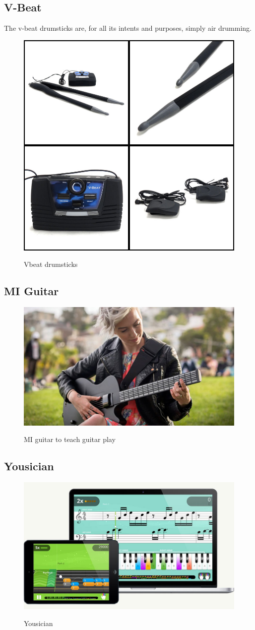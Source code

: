 	\subsection{V-Beat}
		The v-beat drumsticks are, for all its intents and purposes, simply air drumming.
		\begin{figure}[H]
			\centering
			\includegraphics[width=0.5\linewidth]{figure/Analysis/vbeat}
			\label{fig:vbeat}
			\caption{Vbeat drumsticks}
		\end{figure}
		
	\subsection{MI Guitar}
		\begin{figure}[H]
			\centering
			\includegraphics[width=0.8\linewidth]{figure/Analysis/miguitar}
			\label{fig:miguitar}
			\caption{MI guitar to teach guitar play}
		\end{figure}
	
	\subsection{Yousician}
		\begin{figure}[H]
			\centering
			\includegraphics[width=0.8\linewidth]{figure/Analysis/yousician.jpg}
			\label{fig:yousician}
			\caption{Yousician}
		\end{figure}
